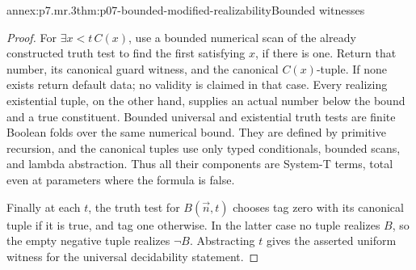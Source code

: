 \begin{annexitem}{annex:p7.mr.3}{thm:p07-bounded-modified-realizability}{Bounded witnesses}
\begin{proof}
For \(\exists x<t\,C(x)\), use a bounded numerical scan of the
already constructed truth test to find the first satisfying \(x\),
if there is one. Return that number, its canonical guard witness, and
the canonical \(C(x)\)-tuple. If none exists return default data;
no validity is claimed in that case. Every realizing existential tuple,
on the other hand, supplies an actual number below the bound and a true
constituent. Bounded universal and existential truth tests are finite
Boolean folds over the same numerical bound. They are defined by
primitive recursion, and the canonical tuples use only typed
conditionals, bounded scans, and lambda abstraction. Thus all their
components are System-T terms, total even at parameters where the
formula is false.

Finally at each \(t\), the truth test for \(B(\vec n,t)\)
chooses tag zero with its canonical tuple if it is true, and tag one
otherwise. In the latter case no tuple realizes \(B\), so the empty
negative tuple realizes \(\neg B\). Abstracting \(t\) gives the
asserted uniform witness for the universal decidability statement.
\end{proof}
\end{annexitem}

